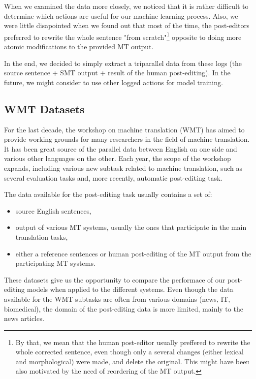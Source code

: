 When we examined the data more closely,
we noticed that it is rather difficult to determine which actions are
useful for our machine learning process. Also, we were little disapointed
when we found out that most of the time, the post-editors preferred to
rewrite the whole sentence "from scratch"\footnote{By that, we mean that the
human post-editor usually preffered to rewrite the whole corrected sentence, even though
only a several changes (either lexical and morphological) were made, and delete the original.
This might have been also motivated by the need of reordering of the MT output.}
opposite to doing more atomic modifications to the provided MT output.

In the end, we decided to simply extract a triparallel data from these logs (the source
sentence + SMT output + result of the human post-editing). In the future,
we might consider to use other logged actions for model training.

\subsection{WMT Datasets}

For the last decade, the workshop on machine translation (WMT) has aimed
to provide working grounds for many researchers in the field of machine
translation. It has been great source of the parallel data between English
on one side and various other languages on the other. Each year, the scope
of the workshop expands, including various new subtask related to machine translation,
such as several evaluation tasks and, more recently, automatic post-editing task.

The data available for the post-editing task usually contains a set of:
\begin{itemize}
    \item source English sentences,
    \item output of various MT systems, usually the ones that participate in the main
translation tasks,
    \item either a reference sentences or human post-editing of the MT output from the participating MT systems.
\end{itemize}

These datasets give us the opportunity to compare the performace of our post-editing
models when applied to the different systems. Even though the data available for the
WMT subtasks are often from various domains (news, IT, biomedical), the domain of the post-editing
data is more limited, mainly to the news articles.

